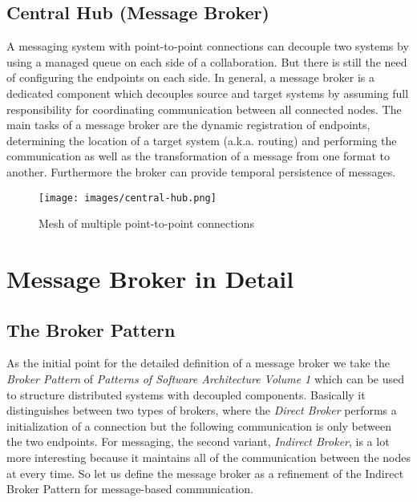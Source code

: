\subsection{Central Hub (Message Broker)}
\label{intro-messaging-broker}
A messaging system with point-to-point connections can decouple two systems
by using a managed queue on each side of a collaboration. But there is
still the need of configuring the endpoints on each side. In general, a
message broker is a dedicated component which decouples source and
target systems by assuming full responsibility for coordinating communication between
all connected nodes. The main tasks of a message broker are the
dynamic registration of endpoints, determining the location of a target system
(a.k.a. routing) and performing the communication as well as the transformation of a
message from one format to another. Furthermore the broker can provide temporal
persistence of messages. \cite{MSDNIntegration} \\

\begin{figure}[H]
    \centering
    \texttt{[image: images/central-hub.png]}
    \caption{Mesh of multiple point-to-point connections}
    \label{fig:central-hub}
\end{figure}


\section{Message Broker in Detail}
\subsection{The Broker Pattern }
As the initial point for the detailed definition of a message broker we take the
\textit{Broker Pattern} of  \textit{Patterns of Software Architecture Volume 1}
which can be used to structure distributed systems with decoupled components.
Basically it distinguishes between two types of brokers, where the \textit{Direct
Broker} performs a initialization of a connection but the following communication
is only between the two endpoints. For messaging, the second variant,
\textit{Indirect Broker}, is a lot more interesting because it maintains all of
the communication between the nodes at every time. So let us define the message
broker as a refinement of the Indirect Broker Pattern for message-based
communication.\cite{POSA1} 

